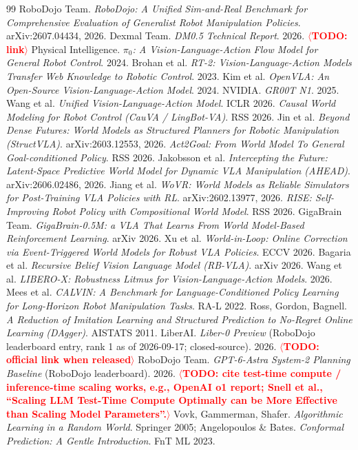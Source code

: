 \documentclass{article}
\newcommand{\TODO}[1]{\textcolor{red}{\textbf{$\langle$TODO: #1$\rangle$}}}
\begin{document}
\begin{thebibliography}{99}\small
{} RoboDojo Team. \emph{RoboDojo: A Unified Sim-and-Real Benchmark for Comprehensive Evaluation of Generalist Robot Manipulation Policies}. arXiv:2607.04434, 2026.
 Dexmal Team. \emph{DM0.5 Technical Report}. 2026. \TODO{link}
 Physical Intelligence. \emph{$\pi_0$: A Vision-Language-Action Flow Model for General Robot Control}. 2024.
 Brohan et al. \emph{RT-2: Vision-Language-Action Models Transfer Web Knowledge to Robotic Control}. 2023.
 Kim et al. \emph{OpenVLA: An Open-Source Vision-Language-Action Model}. 2024.
 NVIDIA. \emph{GR00T N1}. 2025.
 Wang et al. \emph{Unified Vision-Language-Action Model}. ICLR 2026.
 \emph{Causal World Modeling for Robot Control (CauVA / LingBot-VA)}. RSS 2026.
 Jin et al. \emph{Beyond Dense Futures: World Models as Structured Planners for Robotic Manipulation (StructVLA)}. arXiv:2603.12553, 2026.
 \emph{Act2Goal: From World Model To General Goal-conditioned Policy}. RSS 2026.
 Jakobsson et al. \emph{Intercepting the Future: Latent-Space Predictive World Model for Dynamic VLA Manipulation (AHEAD)}. arXiv:2606.02486, 2026.
 Jiang et al. \emph{WoVR: World Models as Reliable Simulators for Post-Training VLA Policies with RL}. arXiv:2602.13977, 2026.
 \emph{RISE: Self-Improving Robot Policy with Compositional World Model}. RSS 2026.
 GigaBrain Team. \emph{GigaBrain-0.5M: a VLA That Learns From World Model-Based Reinforcement Learning}. arXiv 2026.
 Xu et al. \emph{World-in-Loop: Online Correction via Event-Triggered World Models for Robust VLA Policies}. ECCV 2026.
 Bagaria et al. \emph{Recursive Belief Vision Language Model (RB-VLA)}. arXiv 2026.
 Wang et al. \emph{LIBERO-X: Robustness Litmus for Vision-Language-Action Models}. 2026.
 Mees et al. \emph{CALVIN: A Benchmark for Language-Conditioned Policy Learning for Long-Horizon Robot Manipulation Tasks}. RA-L 2022.
 Ross, Gordon, Bagnell. \emph{A Reduction of Imitation Learning and Structured Prediction to No-Regret Online Learning (DAgger)}. AISTATS 2011.
 LiberAI. \emph{Liber-0 Preview} (RoboDojo leaderboard entry, rank 1 as of 2026-09-17; closed-source). 2026. \TODO{official link when released}
 RoboDojo Team. \emph{GPT-6-Astra System-2 Planning Baseline} (RoboDojo leaderboard). 2026.
 \TODO{cite test-time compute / inference-time scaling works, e.g., OpenAI o1 report; Snell et al., ``Scaling LLM Test-Time Compute Optimally can be More Effective than Scaling Model Parameters''.}
 Vovk, Gammerman, Shafer. \emph{Algorithmic Learning in a Random World}. Springer 2005; Angelopoulos \& Bates. \emph{Conformal Prediction: A Gentle Introduction}. FnT ML 2023.
\end{thebibliography}
\end{document}
